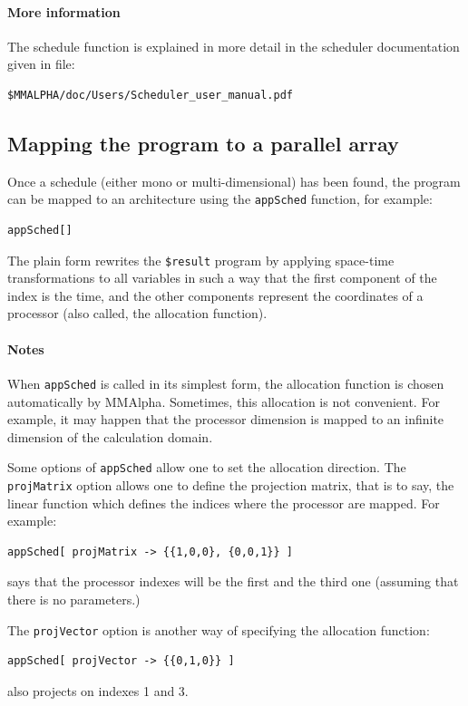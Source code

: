 \documentclass[12pt]{article}
\newcommand{\MMA}{{\sc MMAlpha}}
\newcommand{\mmalpha}{\MMA}
\begin{document}
\paragraph*{More information}
The schedule function is explained in more detail in
{the scheduler documentation}
given in file:
\begin{verbatim}
$MMALPHA/doc/Users/Scheduler_user_manual.pdf
\end{verbatim}

\subsection{Mapping the program to a parallel array}
\label{mapping}
Once a schedule (either mono or multi-dimensional) has been found, 
the program can be mapped to an architecture using the 
\texttt{appSched} function, for example:
\begin{verbatim}
appSched[]
\end{verbatim}
The plain form rewrites the \texttt{\$result} program by applying 
space-time transformations to all variables in such a 
way that the first component of the index is the time, and 
the other components represent the coordinates of a processor
(also called, the allocation function).

\paragraph*{Notes}
When \texttt{appSched} is called in its simplest form, the allocation function
is chosen automatically by \mmalpha{}. Sometimes, this allocation is not convenient.
For example, it may happen that the processor dimension is mapped to 
an infinite dimension of the calculation domain. 

Some options of \texttt{appSched} allow one to set the allocation direction. 
The \texttt{projMatrix} option allows one to define the projection 
matrix, that is to say, the linear function which defines the indices where
the processor are mapped. For example:
\begin{verbatim}
appSched[ projMatrix -> {{1,0,0}, {0,0,1}} ]
\end{verbatim}
says that the processor indexes will be the first and the third one
(assuming that there is no parameters.)

The \texttt{projVector} option is another way of specifying the 
allocation function:
\begin{verbatim}
appSched[ projVector -> {{0,1,0}} ]
\end{verbatim}
also projects on indexes 1 and 3. 
\end{document}
